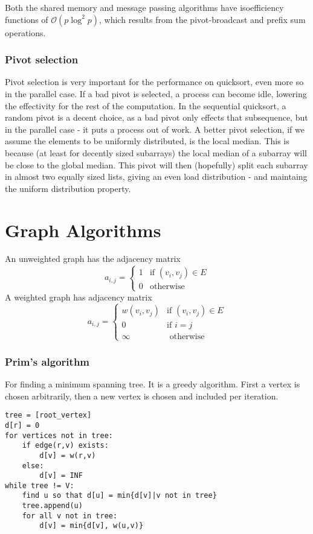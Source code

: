 \documentclass[a4paper,10pt,twoside,twocolumn]{article}
\renewcommand{\(}{\left(}
\renewcommand{\)}{\right)}
\newcommand{\header}[1]{\subsubsection*{#1} \vspace{-0.2cm}}
\begin{document}
Both the shared memory and message passing algorithms have isoefficiency functions of $\mathcal{O}(p \log^2 p)$, which results from the pivot-broadcast and prefix sum operations. \\[-1cm]

\header{Pivot selection}
Pivot selection is very important for the performance on quicksort, even more so in the parallel case. If a bad pivot is selected, a process can become idle, lowering the effectivity for the rest of the computation. In the sequential quicksort, a random pivot is a decent choice, as a bad pivot only effects that subsequence, but in the parallel case - it puts a process out of work. A better pivot selection, if we assume the elements to be uniformly distributed, is the local median. This is because (at least for decently sized subarrays) the local median of a subarray will be close to the global median. This pivot will then (hopefully) split each subarray in almost two equally sized lists, giving an even load distribution - and maintaing the uniform distribution property.

\clearpage

\section*{Graph Algorithms}
An unweighted graph has the adjacency matrix
$$a_{i,j} = \begin{cases}
    1 & \mbox{if } (v_i,v_j)\in E \\
    0 & \mbox{otherwise}
\end{cases}$$
A weighted graph has adjacency matrix
$$a_{i,j} = \begin{cases}
    w(v_i,v_j) & \mbox{if } (v_i,v_j)\in E \\
    0 & \mbox{if } i=j \\
    \infty & \mbox{ otherwise}
\end{cases}$$

\header{Prim's algorithm}
For finding a minimum spanning tree. It is a greedy algorithm. First a vertex is chosen arbitrarily, then a new vertex is chosen and included per iteration.
\begin{verbatim}
tree = [root_vertex]
d[r] = 0
for vertices not in tree:
    if edge(r,v) exists:
        d[v] = w(r,v)
    else:
        d[v] = INF
while tree != V:
    find u so that d[u] = min{d[v]|v not in tree}
    tree.append(u)
    for all v not in tree:
        d[v] = min{d[v], w(u,v)}
\end{verbatim}
\end{document}
